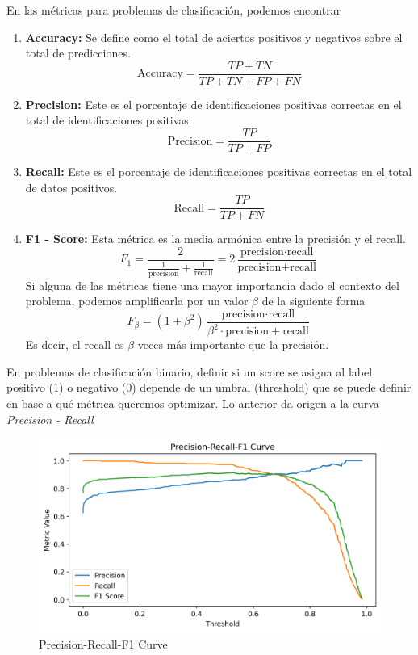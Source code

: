 En las métricas para problemas de clasificación, podemos encontrar
\begin{enumerate}
    \item \textbf{Accuracy:} Se define como el total de aciertos positivos y negativos sobre el total de predicciones. 
    $$ 
    \text{Accuracy} = \frac{TP + TN}{TP + TN + FP + FN}
    $$
    \item \textbf{Precision:} Este es el porcentaje de identificaciones positivas correctas en el total de identificaciones positivas. 
    $$
    \text{Precision} = \frac{TP}{TP + FP}
    $$
    \item \textbf{Recall: } Este es el porcentaje de identificaciones positivas correctas en el total de datos positivos. 
    $$ 
    \text{Recall} = \frac{TP}{TP + FN}
    $$
    \item \textbf{F1 - Score: } Esta métrica es la media armónica entre la precisión y el recall. 
    $$ 
    F_{1} = \frac{2}{\frac{1}{\text{precision}} + \frac{1}{\text{recall}}} = 2 \frac{\text{precision} \cdot \text{recall}}{\text{precision} + \text{recall}}
    $$
    Si alguna de las métricas tiene una mayor importancia dado el contexto del problema, podemos amplificarla por un valor $\beta$ de la siguiente forma
    $$ 
    F_{\beta} = (1 + \beta^2) \frac{\text{precision} \cdot \text{recall}}{\beta^2 \cdot \text{precision} + \text{recall}}
    $$
    Es decir, el recall es $\beta$ veces más importante que la precisión. 
\end{enumerate}

En problemas de clasificación binario, definir si un score se asigna al label positivo (1) o negativo (0) depende de un umbral (threshold) que se puede definir en base a qué métrica queremos optimizar. Lo anterior da origen a la curva \textit{Precision - Recall}

\begin{figure}[H]
    \center
    \includegraphics[scale=0.5]{notebooks/Basic/img/precision_recall_f1_curve.png}
    \caption{Precision-Recall-F1 Curve}
\end{figure}

